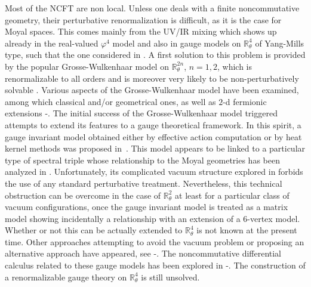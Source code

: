 \documentclass[a4paper,11pt]{article}
\numberwithin{equation}{section}
\theoremstyle{nonumberplain}
\begin{document}
Most of the NCFT are non local. Unless one deals with a finite noncommutative geometry, their perturbative renormalization is difficult, as it is the case   for Moyal spaces. This comes mainly from the UV/IR mixing which shows up already in the real-valued $\varphi^4$ model and also in gauge models on $\mathbb{R}^4_\theta$  of Yang-Mills  type, such that the one considered in \cite{Minwalla:1999px}.   A first solution to this problem is provided by the popular Grosse-Wulkenhaar model on $\mathbb{R}^{2n}_\theta$, $n=1,2$,   which is renormalizable to all orders \cite{Grosse:2003aj-pc} and is moreover very likely to be non-perturbatively solvable \cite{harald-raimar}. Various aspects of the Grosse-Wulkenhaar model have been examined, among which classical and/or geometrical ones, as well as $2$-d fermionic extensions \cite{bwh-1}-\cite{vtw}. The initial success of the Grosse-Wulkenhaar model triggered attempts to extend its features to a gauge theoretical framework. In this spirit, a gauge invariant model obtained either by effective action computation or by heat kernel methods was proposed in~\cite{Wallet:2007c}. This model appears to be linked to a particular type of spectral triple \cite{Grosse:2007jy} whose relationship to the Moyal geometries has been analyzed in \cite{Wallet:2011aa}. Unfortunately, its complicated vacuum structure explored in \cite{GWW2} forbids the use of any standard perturbative treatment. Nevertheless, this technical obstruction can be overcome in the case of $\mathbb{R}^2_\theta$ at least for a particular class of vacuum configurations, once the gauge invariant model is treated as a matrix model \cite{MVW13} showing incidentally  a relationship with an extension of a 6-vertex model. Whether or not this can be actually extended to $\mathbb{R}^4_\theta$ is not known at the present time. Other approaches attempting to avoid the vacuum problem or proposing an alternative approach  have appeared, see \cite{Blaschke:2009c}-\cite{Blaschke:2010ck}. The noncommutative differential calculus related to  these gauge models has been explored in \cite{Wallet:2008bq}-\cite{Wallet:2008b}. The construction of a renormalizable gauge theory on $\mathbb{R}^4_\theta$ is still unsolved.\par
\end{document}
